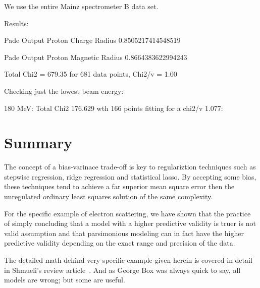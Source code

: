\documentclass[10pt,aps,prc,twocolumn]{revtex4-1}
\begin{document}
We use the entire Mainz spectrometer B data set.

Results:

Pade Output Proton Charge Radius   0.8505217414548519

Pade Output Proton Magnetic Radius 0.8664383622994243

Total Chi2 = 679.35 for 681 data points, Chi2/v = 1.00 

Checking just the lowest beam energy:

180 MeV: Total Chi2 176.629 wth 166 points fitting for a chi2/v 1.077:


\section{Summary}

The concept of a bias-varinace trade-off is key to regulariztion techniques such as stepwise regression, ridge regression and
statistical lasso.    By accepting some bias, these techniques tend to achieve a far superior mean square error then
the unregulated ordinary least squares solution of the same complexity.     

For the specific example of electron scattering, we have shown that the practice of simply 
concluding that a model with
a higher predictive validity is truer is not valid assumption and that parsimonious
modeling can in fact have the higher predictive validity depending on the exact range and precision of the data.

The detailed math dehind very specific example given herein is covered in detail in Shmueli's 
review article~\cite{Shmueli:2010}.  And as George Box was always quick to say, all models are wrong;
but some are useful.


\end{document}
